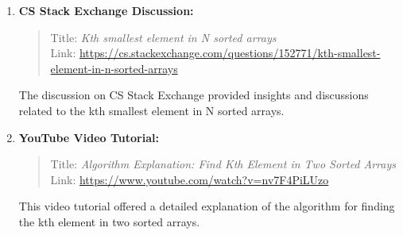 \documentclass{article}
\begin{document}
\begin{enumerate}
    \item \textbf{CS Stack Exchange Discussion:}
    \begin{quote}
        Title: \emph{Kth smallest element in N sorted arrays} \\
        Link: \href{https://cs.stackexchange.com/questions/152771/kth-smallest-element-in-n-sorted-arrays?newreg=d0f1980a43e64b8cb2b51bf9b084780c}{https://cs.stackexchange.com/questions/152771/kth-smallest-element-in-n-sorted-arrays}
    \end{quote}

    The discussion on CS Stack Exchange provided insights and discussions related to the kth smallest element in N sorted arrays. 

    \item \textbf{YouTube Video Tutorial:}
    \begin{quote}
        Title: \emph{Algorithm Explanation: Find Kth Element in Two Sorted Arrays} \\
        Link: \href{https://www.youtube.com/watch?v=nv7F4PiLUzo}{https://www.youtube.com/watch?v=nv7F4PiLUzo}
    \end{quote}

    This video tutorial offered a detailed explanation of the algorithm for finding the kth element in two sorted arrays.

\end{enumerate}
\end{document}
